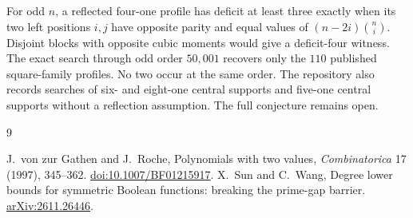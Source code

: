 \documentclass[10pt]{article}
\begin{document}
For odd $n$, a reflected four-one profile has deficit at least three exactly when its two left positions $i,j$ have opposite parity and equal values of $(n-2i)\binom ni$. Disjoint blocks with opposite cubic moments would give a deficit-four witness. The exact search through odd order $50{,}001$ recovers only the $110$ published square-family profiles. No two occur at the same order. The repository also records searches of six- and eight-one central supports and five-one central supports without a reflection assumption. The full conjecture remains open.

\begin{thebibliography}{9}
\raggedright
{} J.~von zur Gathen and J.~Roche, Polynomials with two values, \emph{Combinatorica} 17 (1997), 345--362. \href{https://doi.org/10.1007/BF01215917}{doi:10.1007/BF01215917}.
 X.~Sun and C.~Wang, Degree lower bounds for symmetric Boolean functions: breaking the prime-gap barrier. \href{https://arxiv.org/abs/2611.26446}{arXiv:2611.26446}.
\end{thebibliography}
\end{document}
